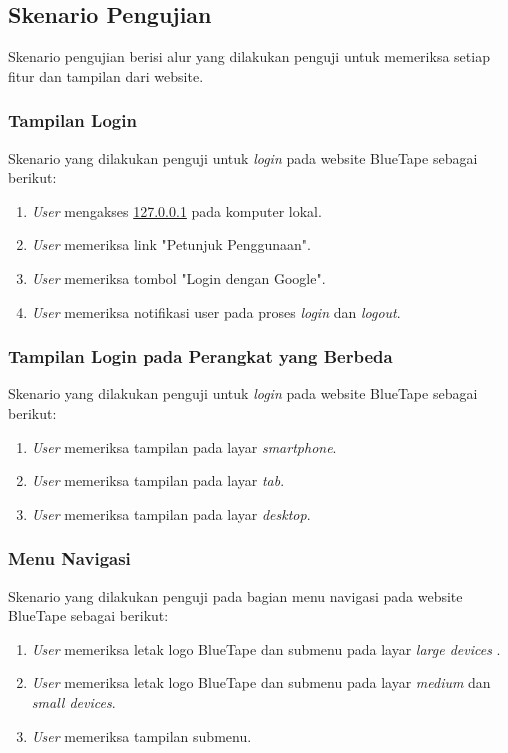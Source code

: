 \subsection{Skenario Pengujian}
Skenario pengujian berisi alur yang dilakukan penguji untuk memeriksa setiap fitur dan tampilan dari website. 
\subsubsection{Tampilan Login}
Skenario yang dilakukan penguji untuk \textit{login} pada website BlueTape sebagai berikut:
\begin{enumerate}
	\item \textit{User} mengakses \url{127.0.0.1} pada komputer lokal.
	\item \textit{User} memeriksa link "Petunjuk Penggunaan".
	\item \textit{User} memeriksa tombol "Login dengan Google".
	\item \textit{User} memeriksa notifikasi user pada proses \textit{login} dan \textit{logout}.	
\end{enumerate}

\subsubsection{Tampilan Login pada Perangkat yang Berbeda}
Skenario yang dilakukan penguji untuk \textit{login} pada website BlueTape sebagai berikut:
\begin{enumerate}
	\item \textit{User} memeriksa tampilan pada layar \textit{smartphone}. 	
	\item \textit{User} memeriksa tampilan pada layar \textit{tab}.
	\item \textit{User} memeriksa tampilan pada layar \textit{desktop}.
\end{enumerate}

\subsubsection{Menu Navigasi}
Skenario yang dilakukan penguji pada bagian menu navigasi pada website BlueTape sebagai berikut:
\begin{enumerate}
	\item \textit{User} memeriksa letak logo BlueTape dan submenu pada layar \textit{large devices} .
	\item \textit{User} memeriksa letak logo BlueTape dan submenu pada layar \textit{medium} dan \textit{small devices}.	
	\item \textit{User} memeriksa tampilan submenu.
\end{enumerate}

